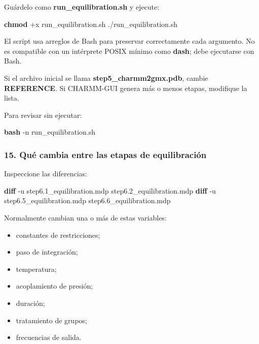 \documentclass[
  spanish,
  11pt,
  a4paper]{article}
\newenvironment{Shaded}{\begin{snugshade}}{\end{snugshade}}
\newcommand{\AttributeTok}[1]{\textcolor[rgb]{0.13,0.29,0.53}{#1}}
\newcommand{\ExtensionTok}[1]{#1}
\newcommand{\FunctionTok}[1]{\textcolor[rgb]{0.13,0.29,0.53}{\textbf{#1}}}
\newcommand{\NormalTok}[1]{#1}
\providecommand{\tightlist}{%
  \setlength{\itemsep}{0pt}\setlength{\parskip}{0pt}}
\begin{document}
Guárdelo como \textbf{run\_equilibration.sh} y ejecute:

\begin{Shaded}
\begin{Highlighting}[]
\FunctionTok{chmod}\NormalTok{ +x run\_equilibration.sh}
\ExtensionTok{./run\_equilibration.sh}
\end{Highlighting}
\end{Shaded}

El script usa arreglos de Bash para preservar correctamente cada
argumento. No es compatible con un intérprete POSIX mínimo como
\textbf{dash}; debe ejecutarse con Bash.

Si el archivo inicial se llama \textbf{step5\_charmm2gmx.pdb}, cambie
\textbf{REFERENCE}. Si CHARMM-GUI genera más o menos etapas, modifique
la lista.

Para revisar sin ejecutar:

\begin{Shaded}
\begin{Highlighting}[]
\FunctionTok{bash} \AttributeTok{{-}n}\NormalTok{ run\_equilibration.sh}
\end{Highlighting}
\end{Shaded}

\subsubsection{15. Qué cambia entre las etapas de
equilibración}\label{quuxe9-cambia-entre-las-etapas-de-equilibraciuxf3n}

Inspeccione las diferencias:

\begin{Shaded}
\begin{Highlighting}[]
\FunctionTok{diff} \AttributeTok{{-}u}\NormalTok{ step6.1\_equilibration.mdp step6.2\_equilibration.mdp}
\FunctionTok{diff} \AttributeTok{{-}u}\NormalTok{ step6.5\_equilibration.mdp step6.6\_equilibration.mdp}
\end{Highlighting}
\end{Shaded}

Normalmente cambian una o más de estas variables:

\begin{itemize}
\tightlist
\item
  constantes de restricciones;
\item
  paso de integración;
\item
  temperatura;
\item
  acoplamiento de presión;
\item
  duración;
\item
  tratamiento de grupos;
\item
  frecuencias de salida.
\end{itemize}
\end{document}
